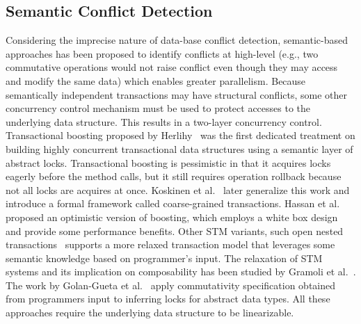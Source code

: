 \documentclass[10pt,conference,compsocconf]{IEEEtran}
\begin{document}
\subsection{Semantic Conflict Detection}
Considering the imprecise nature of data-base conflict detection, semantic-based approaches has been proposed to identify conflicts at high-level (e.g., two commutative operations would not raise conflict even though they may access and modify the same data) which enables greater parallelism.
Because semantically independent transactions may have structural conflicts, some other concurrency control mechanism must be used to protect accesses to the underlying data structure.
This results in a two-layer concurrency control.
Transactional boosting proposed by Herlihy~\cite{herlihy2008transactional} was the first dedicated treatment on building highly concurrent transactional data structures using a semantic layer of abstract locks. 
Transactional boosting is pessimistic in that it acquires locks eagerly before the method calls, but it still requires operation rollback because not all locks are acquires at once.
Koskinen et al.~\cite{koskinen2010coarse} later generalize this work and introduce a formal framework called coarse-grained transactions.
Hassan et al.~\cite{hassan2014developing} proposed an optimistic version of boosting, which employs a white box design and provide some performance benefits.
Other STM variants, such open nested transactions~\cite{ni2007open} supports a more relaxed transaction model that leverages some semantic knowledge based on programmer's input.
The relaxation of STM systems and its implication on composability has been studied by Gramoli et al.~\cite{gramoli2013composing}.
The work by Golan-Gueta et al.~\cite{golan2015automatic} apply commutativity specification obtained from programmers input to inferring locks for abstract data types.
All these approaches require the underlying data structure to be linearizable.
\end{document}
